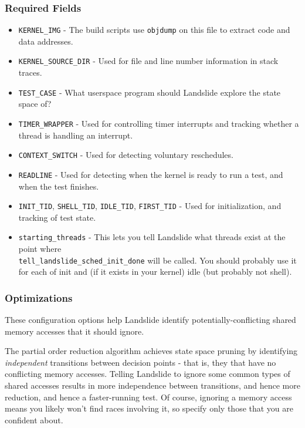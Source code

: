 \documentclass{article}
\begin{document}
\subsubsection{Required Fields}
\begin{itemize}
	\item \texttt{KERNEL\_IMG} - The build scripts use \texttt{objdump} on this file to extract code and data addresses.
	\item \texttt{KERNEL\_SOURCE\_DIR} - Used for file and line number information in stack traces.
	\item \texttt{TEST\_CASE} - What userspace program should Landslide explore the state space of?
	\item \texttt{TIMER\_WRAPPER} - Used for controlling timer interrupts and tracking whether a thread is handling an interrupt.
	\item \texttt{CONTEXT\_SWITCH} - Used for detecting voluntary reschedules.
	\item \texttt{READLINE} - Used for detecting when the kernel is ready to run a test, and when the test finishes.
	\item \texttt{INIT\_TID}, \texttt{SHELL\_TID}, \texttt{IDLE\_TID}, \texttt{FIRST\_TID} - Used for initialization, and tracking of test state.
	\item \texttt{starting\_threads} - This lets you tell Landslide what threads exist at the point where \\ \texttt{tell\_landslide\_sched\_init\_done} will be called. You should probably use it for each of init and (if it exists in your kernel) idle (but probably not shell).
\end{itemize}

\subsubsection{Optimizations}

These configuration options help Landslide identify potentially-conflicting shared memory accesses that it should ignore.

The partial order reduction algorithm achieves state space pruning by identifying {\em independent} transitions between decision points - that is, they that have no conflicting memory accesses. Telling Landslide to ignore some common types of shared accesses results in more independence between transitions, and hence more reduction, and hence a faster-running test. Of course, ignoring a memory access means you likely won't find races involving it, so specify only those that you are confident about.
\end{document}
